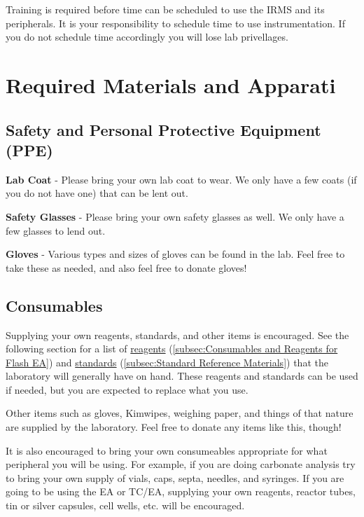 \documentclass[12pt]{../SOP4_alpha}\usepackage[]{graphicx}\usepackage[]{color}
\begin{document}
\NP Training is required before time can be scheduled to use the IRMS and its peripherals. It is your responsibility to schedule time to use instrumentation. If you do not schedule time accordingly you will lose lab privellages.


\section{Required Materials and Apparati}

\subsection{Safety and Personal Protective Equipment (PPE)}

\NP \textbf{Lab Coat} - Please bring your own lab coat to wear. We only have a few coats (if you do not have one) that can be lent out.

\NP \textbf{Safety Glasses} - Please bring your own safety glasses as well. We only have a few glasses to lend out.

\NP \textbf{Gloves} - Various types and sizes of gloves can be found in the lab. Feel free to take these as needed, and also feel free to donate gloves!

\subsection{Consumables}

\NP Supplying your own reagents, standards, and other items is encouraged. See the following section for a list of \hyperref[subsec:Consumables and Reagents for Flash EA]{reagents} (\ref{subsec:Consumables and Reagents for Flash EA}) and \hyperref[subsec:Standard Reference Materials]{standards} (\ref{subsec:Standard Reference Materials}) that the laboratory will generally have on hand. These reagents and standards can be used if needed, but you are expected to replace what you use.

\NP Other items such as gloves, Kimwipes, weighing paper, and things of that nature are supplied by the laboratory. Feel free to donate any items like this, though!

\NP It is also encouraged to bring your own consumeables appropriate for what peripheral you will be using. For example, if you are doing carbonate analysis try to bring your own supply of vials, caps, septa, needles, and syringes. If you are going to be using the EA or TC/EA, supplying your own reagents, reactor tubes, tin or silver capsules, cell wells, etc. will be encouraged.
\end{document}
